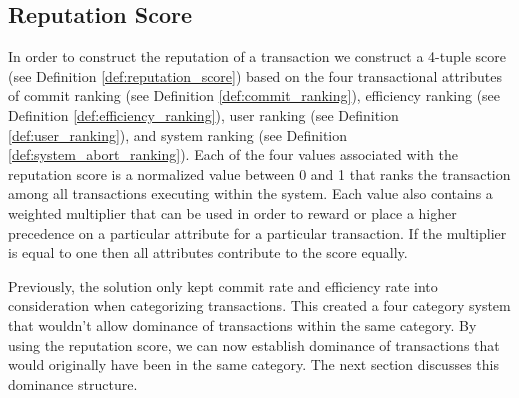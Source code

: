 \subsection{Reputation Score}
\label{sec:reputation_score}

In order to construct the reputation of a transaction we construct a 4-tuple score (see Definition \ref{def:reputation_score}) based on the four transactional attributes of commit ranking (see Definition \ref{def:commit_ranking}), efficiency ranking (see Definition \ref{def:efficiency_ranking}), user ranking (see Definition \ref{def:user_ranking}), and system ranking (see Definition \ref{def:system_abort_ranking}). Each of the four values associated with the reputation score is a normalized value between 0 and 1 that ranks the transaction among all transactions executing within the system. Each value also contains a weighted multiplier that can be used in order to reward or place a higher precedence on a particular attribute for a particular transaction. If the multiplier is equal to one then all attributes contribute to the score equally.

Previously, the solution only kept commit rate and efficiency rate into consideration when categorizing transactions. This created a four category system that wouldn't allow dominance of transactions within the same category. By using the reputation score, we can now establish dominance of transactions that would originally have been in the same category. The next section discusses this dominance structure.


